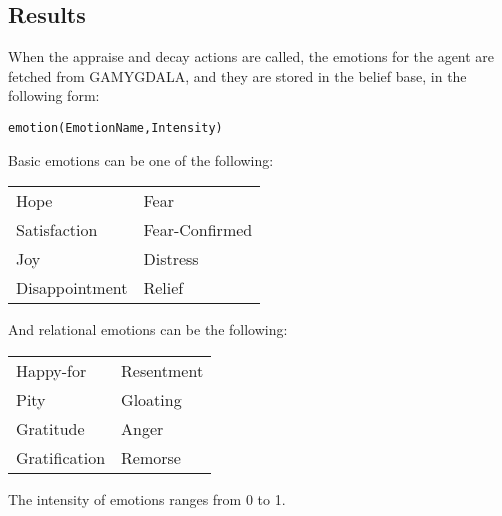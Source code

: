 \clearpage
\subsection{Results}
When the appraise and decay actions are called, the emotions for the agent are fetched from GAMYGDALA, and they are stored in the belief base, in the following form:
\begin{center}
	\texttt{emotion(EmotionName,Intensity)}
\end{center}

\hspace{-\parindent}Basic emotions can be one of the following:

\begin{center}
\begin{tabular}[H]{@{}p{3cm} l}
	Hope & Fear \\
	Satisfaction & Fear-Confirmed \\
	Joy & Distress \\
	Disappointment & Relief
\end{tabular}
\end{center}
\vspace{1em}\hspace{-\parindent}And relational emotions can be the following:

\begin{center}
\begin{tabular}[H]{@{}p{3cm} l}
	Happy-for & Resentment \\
	Pity & Gloating \\
	Gratitude & Anger \\
	Gratification & Remorse
\end{tabular}
\end{center}
\vspace{1em}\hspace{-\parindent}The intensity of emotions ranges from 0 to 1.